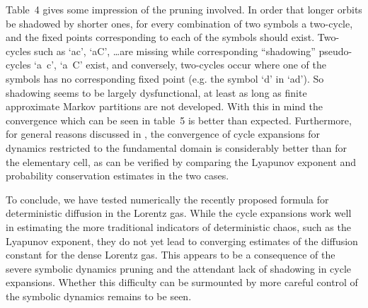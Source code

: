 Table~4 gives some impression of the pruning involved.
In order that longer orbits be shadowed by shorter ones,
for every combination of two symbols a two-cycle,
and the fixed points corresponding to each of the symbols should exist.
Two-cycles such as `ac', `aC', \ldots are missing while
corresponding ``shadowing'' pseudo-cycles `a~c', `a~C' exist, and
conversely, two-cycles occur where one of the symbols
has no corresponding fixed point
(e.g. the symbol `d' in `ad'). So shadowing seems to be largely dysfunctional,
at least as long as finite approximate Markov partitions are
not developed.
With this in mind the convergence which can be seen in table~5
is better than expected. Furthermore, for general reasons discussed
in , the convergence of cycle expansions for dynamics
restricted to the fundamental domain is considerably better
than for the elementary cell, as can be verified by comparing
the Lyapunov exponent and probability conservation estimates in
the two cases.


To conclude, we have tested numerically the recently proposed formula
for deterministic diffusion in the Lorentz gas.
While the cycle expansions work well in estimating
the more traditional indicators of deterministic chaos, such as
the Lyapunov exponent, they do not yet lead to converging estimates
of the diffusion constant for the dense Lorentz gas. This appears to
be a consequence of the severe symbolic dynamics pruning and the
attendant lack of shadowing in cycle expansions. Whether this difficulty
can be surmounted by more careful control of the symbolic dynamics
remains to be seen.

